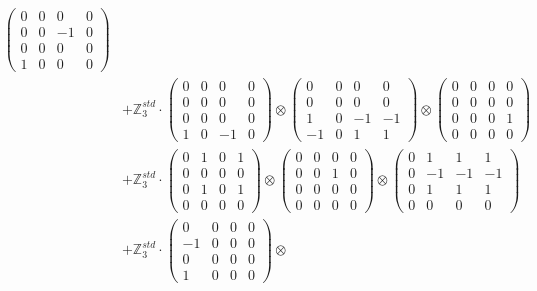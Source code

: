 \documentclass{article}
\begin{document}
{\begin{align}
            \begin{pmatrix} 0 & 0 & 0 & 0 \\ 0 & 0 & -1 & 0 \\ 0 & 0 & 0 & 0 \\ 1 & 0 & 0 & 0 \end{pmatrix} \\ 
        &+ \label{Rs16-Rc11-Solution-20-c25} \mathbb{Z}_3^{std} \cdot 
            \begin{pmatrix} 0 & 0 & 0 & 0 \\ 0 & 0 & 0 & 0 \\ 0 & 0 & 0 & 0 \\ 1 & 0 & -1 & 0 \end{pmatrix} \otimes 
            \begin{pmatrix} 0 & 0 & 0 & 0 \\ 0 & 0 & 0 & 0 \\ 1 & 0 & -1 & -1 \\ -1 & 0 & 1 & 1 \end{pmatrix} \otimes 
            \begin{pmatrix} 0 & 0 & 0 & 0 \\ 0 & 0 & 0 & 0 \\ 0 & 0 & 0 & 1 \\ 0 & 0 & 0 & 0 \end{pmatrix} \\ 
        &+ \label{Rs16-Rc11-Solution-20-c26} \mathbb{Z}_3^{std} \cdot 
            \begin{pmatrix} 0 & 1 & 0 & 1 \\ 0 & 0 & 0 & 0 \\ 0 & 1 & 0 & 1 \\ 0 & 0 & 0 & 0 \end{pmatrix} \otimes 
            \begin{pmatrix} 0 & 0 & 0 & 0 \\ 0 & 0 & 1 & 0 \\ 0 & 0 & 0 & 0 \\ 0 & 0 & 0 & 0 \end{pmatrix} \otimes 
            \begin{pmatrix} 0 & 1 & 1 & 1 \\ 0 & -1 & -1 & -1 \\ 0 & 1 & 1 & 1 \\ 0 & 0 & 0 & 0 \end{pmatrix} \\ 
        &+ \label{Rs16-Rc11-Solution-20-c27} \mathbb{Z}_3^{std} \cdot 
            \begin{pmatrix} 0 & 0 & 0 & 0 \\ -1 & 0 & 0 & 0 \\ 0 & 0 & 0 & 0 \\ 1 & 0 & 0 & 0 \end{pmatrix} \otimes 

\end{align}}
\end{document}
